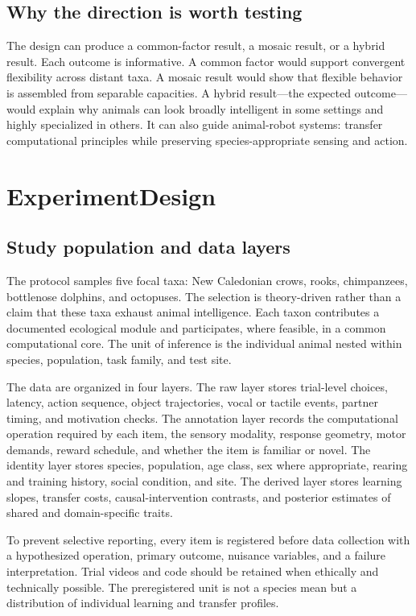 \documentclass[conference]{IEEEtran}
\begin{document}
\subsection{Why the direction is worth testing}
The design can produce a common-factor result, a mosaic result, or a hybrid result. Each outcome is informative. A common factor would support convergent flexibility across distant taxa. A mosaic result would show that flexible behavior is assembled from separable capacities. A hybrid result---the expected outcome---would explain why animals can look broadly intelligent in some settings and highly specialized in others. It can also guide animal-robot systems: transfer computational principles while preserving species-appropriate sensing and action.

\section{ExperimentDesign}
\subsection{Study population and data layers}
The protocol samples five focal taxa: New Caledonian crows, rooks, chimpanzees, bottlenose dolphins, and octopuses. The selection is theory-driven rather than a claim that these taxa exhaust animal intelligence. Each taxon contributes a documented ecological module and participates, where feasible, in a common computational core. The unit of inference is the individual animal nested within species, population, task family, and test site.

The data are organized in four layers. The raw layer stores trial-level choices, latency, action sequence, object trajectories, vocal or tactile events, partner timing, and motivation checks. The annotation layer records the computational operation required by each item, the sensory modality, response geometry, motor demands, reward schedule, and whether the item is familiar or novel. The identity layer stores species, population, age class, sex where appropriate, rearing and training history, social condition, and site. The derived layer stores learning slopes, transfer costs, causal-intervention contrasts, and posterior estimates of shared and domain-specific traits.

To prevent selective reporting, every item is registered before data collection with a hypothesized operation, primary outcome, nuisance variables, and a failure interpretation. Trial videos and code should be retained when ethically and technically possible. The preregistered unit is not a species mean but a distribution of individual learning and transfer profiles.
\end{document}

